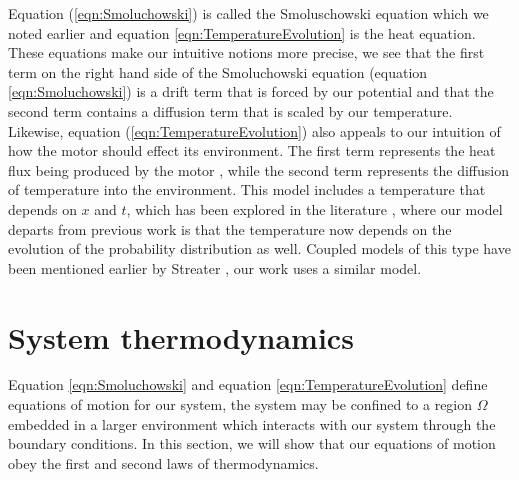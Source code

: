 Equation (\ref{eqn:Smoluchowski}) is called the Smoluschowski equation which we noted earlier and equation \ref{eqn:TemperatureEvolution} is the heat equation. These equations make our intuitive notions more precise, we see that the first term on the right hand side of the Smoluchowski equation (equation \ref{eqn:Smoluchowski}) is a drift term that is forced by our potential and that the second term contains a diffusion term that is scaled by our temperature. Likewise, equation (\ref{eqn:TemperatureEvolution}) also appeals to our intuition of how the motor should effect its environment. The first term represents the heat flux being produced by the motor \cite{M.W.Jack2016}, while the second term represents the diffusion of temperature into the environment. This model includes a temperature that depends on $x$ and $t$, which has been explored in the literature \cite{Kramers1940}, where our model departs from previous work is that the temperature now depends on the evolution of the probability distribution as well. Coupled models of this type have been mentioned earlier by Streater \cite{Streater1997, Streater1997a,Streater2000,Streater1997b}, our work uses a similar model.

\section{System thermodynamics} \label{thermodynamics}
Equation \ref{eqn:Smoluchowski} and equation \ref{eqn:TemperatureEvolution} define equations of motion for our system, the system may be confined to a region $\Omega$ embedded in a larger environment which interacts with our system through the boundary conditions. In this section, we will show that our equations of motion obey the first and second laws of thermodynamics.


